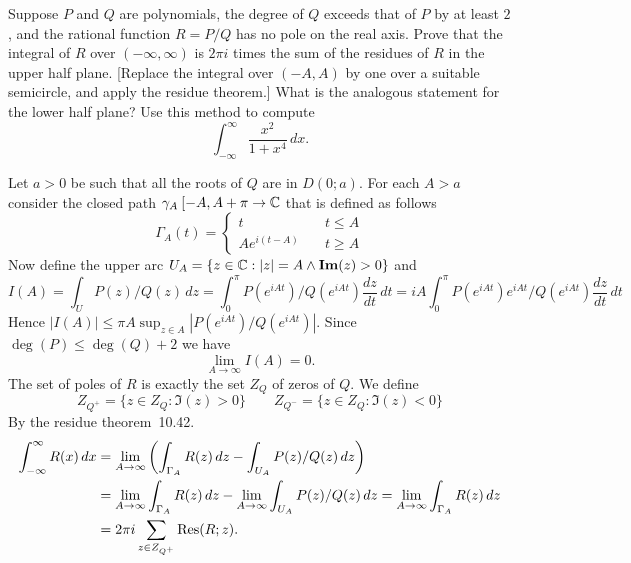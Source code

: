 \begin{enumerate}
\begin{excopy}
Suppose $P$ and $Q$ are polynomials, the  degree of $Q$ exceeds that of $P$
by at least $2$,
and the rational function \(R = P/Q\) has no pole on the real axis.
Prove that the integral of $R$ over \((-\infty,\infty)\)
is \(2\pi i\) times the sum of the residues of $R$ in the upper half plane.
[Replace the integral over \((-A,A)\)  by one over a suitable semicircle,
and apply the residue theorem.] What is the analogous statement for the lower
half plane? Use this method to compute
\begin{equation*}
 \int_{-\infty}^\infty \frac{x^2}{1+x^4}\,dx.
\end{equation*}
\end{excopy}

Let \(a>0\) be such that all the roots of $Q$ are in \(D(0;a)\).
For each \(A>a\) consider the closed path 
\(\gamma_A\: [-A, A+\pi \to\mathbb{C}\) that is defined as follows
\begin{equation*}
\Gamma_A(t) = \left\{%
\begin{array}{ll}
t & t \leq A \\
Ae^{i(t-A)} \quad & t \geq A
\end{array}\right.
\end{equation*}
Now define the upper arc \(U_A=\{z\in\mathbb{C}: |z|=A \wedge \mathop{\bf Im}\nolimits(z)>0\}\) and
\begin{equation*}
I(A) 
= \int_U P(z)/Q(z)\,dz 
= \int_0^\pi P(e^{iAt})/Q(e^{iAt})\frac{dz}{dt}\,dt
= iA\int_0^\pi P(e^{iAt})e^{iAt}/Q(e^{iAt})\frac{dz}{dt}\,dt
\end{equation*}
Hence \(|I(A)| \leq \pi A \sup_{z\in A} |P(e^{iAt})/Q(e^{iAt})|\).
Since \(\deg(P) \leq \deg(Q)+2\) we have
\begin{equation*}
\lim_{A\to\infty} I(A) = 0.
\end{equation*}
The set of poles of $R$ is exactly the set \(Z_Q\) of zeros of $Q$.
We define 
\begin{equation*}
Z_{Q^+} = \{z\in Z_Q: \Im(z)>0\}
\qquad
Z_{Q^-} = \{z\in Z_Q: \Im(z)<0\}
\end{equation*}
By the residue theorem~10.42.
\begin{align*}
\int_{-\infty}^\infty R(x)\,dx 
&= \lim_{A\to\infty} 
   \left(\int_{\Gamma_A}  R(z)\,dz - \int_{U_A} P(z)/Q(z)\,dz\right) \\
&= \lim_{A\to\infty} \int_{\Gamma_A}  R(z)\,dz 
   - \lim_{A\to\infty} \int_{U_A} P(z)/Q(z)\,dz 
 = \lim_{A\to\infty} \int_{\Gamma_A}  R(z)\,dz \\
&= 2\pi i \sum_{z\in Z_{Q^+}} \mathop{\rm Res}\nolimits(R;z).
\end{align*}


\end{enumerate}
